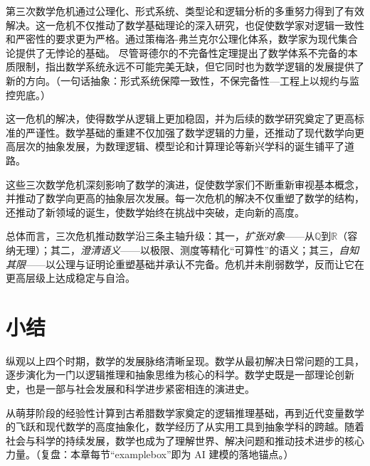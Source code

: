 第三次数学危机通过公理化、形式系统、类型论和逻辑分析的多重努力得到了有效解决。这一危机不仅推动了数学基础理论的深入研究，也促使数学家对逻辑一致性和严密性的要求更为严格。通过策梅洛-弗兰克尔公理化体系，数学家为现代集合论提供了无悖论的基础。
尽管哥德尔的不完备性定理提出了数学体系不完备的本质限制，指出数学系统永远不可能完美无缺，但它同时也为数学逻辑的发展提供了新的方向。{（一句话抽象：形式系统保障一致性，不保完备性—工程上以规约与监控兜底。）}

这一危机的解决，使得数学从逻辑上更加稳固，并为后续的数学研究奠定了更高标准的严谨性。数学基础的重建不仅加强了数学逻辑的力量，还推动了现代数学向更高层次的抽象发展，为数理逻辑、模型论和计算理论等新兴学科的诞生铺平了道路。

这些三次数学危机深刻影响了数学的演进，促使数学家们不断重新审视基本概念，并推动了数学向更高的抽象层次发展。每一次危机的解决不仅重塑了数学的结构，还推动了新领域的诞生，使数学始终在挑战中突破，走向新的高度。

总体而言，三次危机推动数学沿三条主轴升级：其一，{\itshape 扩张对象}——从$\mathbb{Q}$到$\mathbb{R}$（容纳无理）；其二，{\itshape 澄清语义}——以极限、测度等精化“可算性”的语义；其三，{\itshape 自知其限}——以公理与证明论重塑基础并承认不完备。危机并未削弱数学，反而让它在更高层级上达成稳定与自洽。

\section{小结}
纵观以上四个时期，数学的发展脉络清晰呈现。数学从最初解决日常问题的工具，逐步演化为一门以逻辑推理和抽象思维为核心的科学。数学史既是一部理论创新史，也是一部与社会发展和科学进步紧密相连的演进史。

从萌芽阶段的经验性计算到古希腊数学家奠定的逻辑推理基础，再到近代变量数学的飞跃和现代数学的高度抽象化，数学经历了从实用工具到抽象学科的跨越。随着社会与科学的持续发展，数学也成为了理解世界、解决问题和推动技术进步的核心力量。{（复盘：本章每节“examplebox”即为 AI 建模的落地锚点。）}

